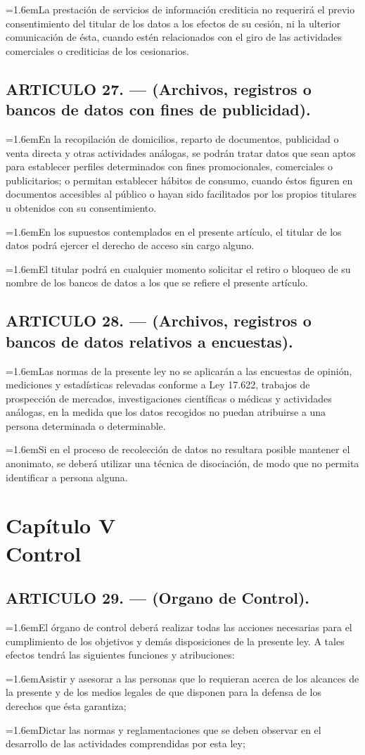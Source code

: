 \documentclass[10pt,a4paper]{article}
\newcommand{\capitulo}[2]{\section[#1 --- #2]{#1\\[2pt]#2}}
\newcommand{\articulo}[1]{\subsection{#1}}
\newcommand{\inciso}[2]{\par{\hangindent=1.6em\hangafter=1\makebox[1.6em][l]{#1}#2\par}}
\begin{document}
\inciso{5.}{La prestación de servicios de información crediticia no requerirá el previo consentimiento del titular de los datos a los efectos de su cesión, ni la ulterior comunicación de ésta, cuando estén relacionados con el giro de las actividades comerciales o crediticias de los cesionarios.}

\articulo{ARTICULO 27. — (Archivos, registros o bancos de datos con fines de publicidad).}
\inciso{1.}{En la recopilación de domicilios, reparto de documentos, publicidad o venta directa y otras actividades análogas, se podrán tratar datos que sean aptos para establecer perfiles determinados con fines promocionales, comerciales o publicitarios; o permitan establecer hábitos de consumo, cuando éstos figuren en documentos accesibles al público o hayan sido facilitados por los propios titulares u obtenidos con su consentimiento.}

\inciso{2.}{En los supuestos contemplados en el presente artículo, el titular de los datos podrá ejercer el derecho de acceso sin cargo alguno.}

\inciso{3.}{El titular podrá en cualquier momento solicitar el retiro o bloqueo de su nombre de los bancos de datos a los que se refiere el presente artículo.}

\articulo{ARTICULO 28. — (Archivos, registros o bancos de datos relativos a encuestas).}
\inciso{1.}{Las normas de la presente ley no se aplicarán a las encuestas de opinión, mediciones y estadísticas relevadas conforme a Ley 17.622, trabajos de prospección de mercados, investigaciones científicas o médicas y actividades análogas, en la medida que los datos recogidos no puedan atribuirse a una persona determinada o determinable.}

\inciso{2.}{Si en el proceso de recolección de datos no resultara posible mantener el anonimato, se deberá utilizar una técnica de disociación, de modo que no permita identificar a persona alguna.}

\capitulo{Capítulo V}{Control}
\articulo{ARTICULO 29. — (Organo de Control).}
\inciso{1.}{El órgano de control deberá realizar todas las acciones necesarias para el cumplimiento de los objetivos y demás disposiciones de la presente ley. A tales efectos tendrá las siguientes funciones y atribuciones:}

\inciso{a)}{Asistir y asesorar a las personas que lo requieran acerca de los alcances de la presente y de los medios legales de que disponen para la defensa de los derechos que ésta garantiza;}

\inciso{b)}{Dictar las normas y reglamentaciones que se deben observar en el desarrollo de las actividades comprendidas por esta ley;}
\end{document}

